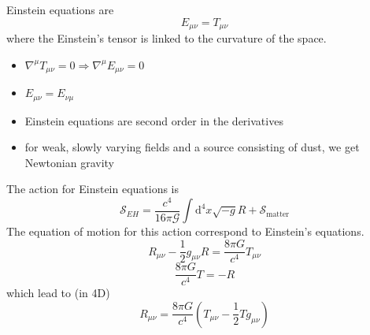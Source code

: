 \documentclass[a4paper]{book}
\theoremstyle{definition}
\theoremstyle{remark}
\begin{document}
Einstein equations are 
\begin{equation}
    E_{\mu\nu} = T_{\mu\nu}
\end{equation}
where the Einstein's tensor is linked to the curvature of the space. 
\begin{itemize}
    \item $\nabla^\mu T_{\mu\nu} = 0 \Rightarrow \nabla^\mu E_{\mu\nu} = 0$
    \item $E_{\mu\nu} = E_{\nu\mu}$
    \item Einstein equations are second order in the derivatives 
    \item for weak, slowly varying fields and a source consisting of dust, we get Newtonian gravity
\end{itemize}
The action for Einstein equations is 
\begin{equation}
    \mathcal{S}_{EH} = \frac{c^4}{16\pi \mathcal{G}}\int \text{d}^4 x \sqrt{-g}R + \mathcal{S}_{\text{matter}}
\end{equation}
The equation of motion for this action correspond to Einstein's equations. 
\begin{equation}
    R_{\mu\nu} - \frac{1}{2}g_{\mu\nu}R = \frac{8\pi G}{c^4}T_{\mu\nu}
\end{equation}
\begin{equation}
    \frac{8\pi G}{c^4}T = -R
\end{equation}
which lead to (in 4D)
\begin{equation}
    R_{\mu\nu} = \frac{8\pi G}{c^4}(T_{\mu\nu} - \frac{1}{2}Tg_{\mu\nu})
\end{equation}
\end{document}
